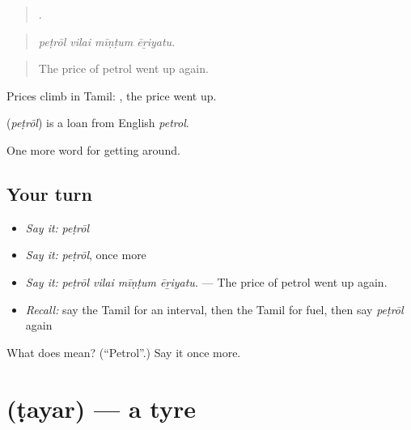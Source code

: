 \begin{quote}
   .
\end{quote}

\begin{quote}
\emph{peṭrōl vilai mīṇṭum ēṟiyatu.}
\end{quote}

\begin{quote}
The price of petrol went up again.
\end{quote}

Prices climb in Tamil:  , the price went up.

\begin{cousinweb}
\textbf{} (\emph{peṭrōl}) is a loan from English \emph{petrol}.
\end{cousinweb}

\begin{grammarlens}[title={What you've built}]
One more word for getting around.
\end{grammarlens}

\subsection*{Your turn}
\begin{itemize}
\raggedright
  \item \emph{Say it:} \emph{peṭrōl}
  \item \emph{Say it:} \emph{peṭrōl}, once more
  \item \emph{Say it:} \emph{peṭrōl vilai mīṇṭum ēṟiyatu.} — The price of petrol went up again.
  \item \emph{Recall:} say the Tamil for an interval, then the Tamil for fuel, then say \emph{peṭrōl} again
\end{itemize}

\begin{tcolorbox}[breakable,colback=teal!4,colframe=teal!35!black,title={Before you move on}]
What does  mean? (\textquotedblleft{}Petrol\textquotedblright{}.) Say it once more.
\end{tcolorbox}
\section[\texorpdfstring{\ta{டயர்} (ṭayar)}{டயர் (ṭayar)}]{ (ṭayar) — a tyre}

\label{lesson:TA-C406-tayar}



